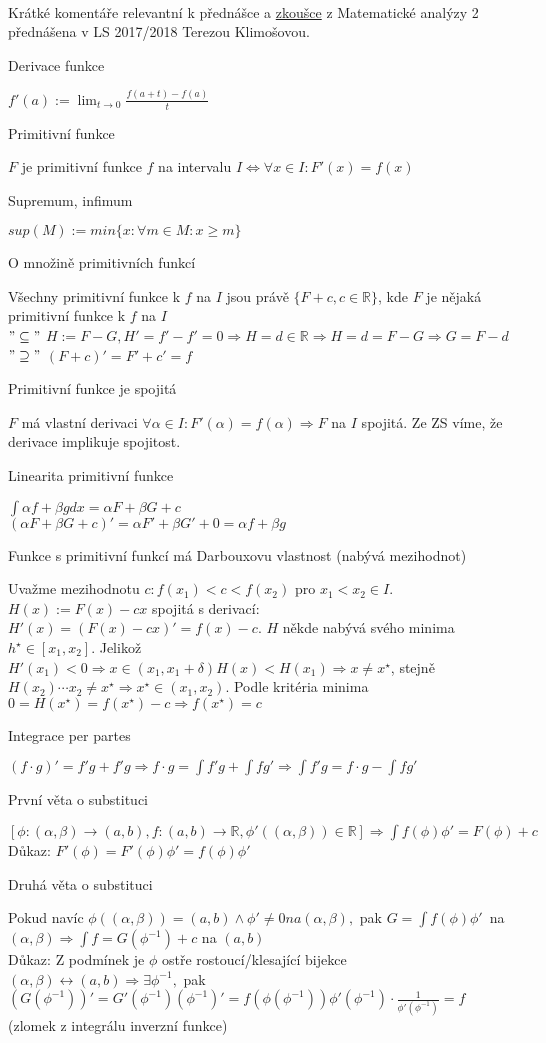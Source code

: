 \documentclass[a4paper]{article}
\theoremstyle{definition}
\newcommand{\baseAll}[3]{\begin{#1}{#2} \begin{flushleft} #3 \end{flushleft} \end{#1}}
\newcommand{\de}[2]{\baseAll{definition}{#1}{#2}}
\newcommand{\ve}[2]{\baseAll{theorem}{#1}{#2}}
\begin{document}
\text{}\vspace{-0.1cm}
{\fontsize{12}{15}\selectfont \hspace{-0.1cm}}
\vspace{1cm} \\
Krátké komentáře relevantní k přednášce a \href{https://iuuk.mff.cuni.cz/~tereza/teaching-files-17/popis-zkouskyMA2.pdf}{zkoušce} z Matematické analýzy 2 přednášena v LS 2017/2018 Terezou Klimošovou. 

\de{Derivace funkce}{$ f'(a) := \lim_{t \rightarrow 0} \frac{f(a+t)-f(a)}{t} $}
\de{Primitivní funkce}{ $ F $ je primitivní funkce $ f $ na intervalu $I  \Leftrightarrow \forall x \in I: F'(x) = f(x)$}
\de{Supremum, infimum}{ $ sup(M) := min\{x: \forall m \in M: x \ge m\}$}
\ve{O množině primitivních funkcí}{Všechny primitivní funkce k $f$ na $I$ jsou právě $\{F+c, c \in \mathbb{R}\}$, kde $F$ je nějaká primitivní funkce k $f$ na $I$ \\ $"\subseteq"$ $H := F-G, H' = f'-f' = 0 \Rightarrow H = d \in \mathbb{R} \Rightarrow H = d = F - G \Rightarrow G = F - d$ \\ $"\supseteq"$ $(F+c)' = F' + c' = f$}
\ve{Primitivní funkce je spojitá}{$F$ má vlastní derivaci $\forall \alpha \in I: F'(\alpha)=f(\alpha) \Rightarrow F$  na $I$ spojitá. Ze ZS víme, že derivace implikuje spojitost.}
\ve{Linearita primitivní funkce}{$\int \alpha f+ \beta g dx = \alpha F + \beta G +c $ \\ $( \alpha F + \beta G +c)' = \alpha F'+\beta G' +0 = \alpha f+\beta g  $}
\ve{Funkce s primitivní funkcí má Darbouxovu vlastnost (nabývá mezihodnot)}{Uvažme mezihodnotu $c: f(x_1) < c < f(x_2) $ pro $x_1 < x_2 \in I$. $H(x) := F(x) - cx $ spojitá s derivací: $H'(x) = (F(x) - cx)' = f(x)-c$. $H$ někde nabývá svého minima $h^\star \in [x_1,x_2]$. Jelikož $H'(x_1) <0 \Rightarrow x \in (x_1, x_1 + \delta) H(x) < H(x_1) \Rightarrow x \ne x^\star$, stejně $H(x_2) \cdots x_2 \ne x^\star \Rightarrow x^\star \in (x_1,x_2)$. Podle kritéria minima $0 = H(x^\star) = f(x^\star) - c \Rightarrow f(x^\star) = c$}
\ve{Integrace per partes}{$(f\cdot g)' = f'g + f'g \Rightarrow f \cdot g = \int f'g + \int fg' \Rightarrow \int f'g = f\cdot g - \int fg'$}
\ve{První věta o substituci}{$[\phi: (\alpha, \beta) \rightarrow (a,b), f: (a,b) \rightarrow \mathbb{R}, \phi'( (\alpha, \beta) ) \in \mathbb{R}] \Rightarrow \int f(\phi)\phi' = F(\phi) +c$\\Důkaz:  $F'(\phi) = F'(\phi)\phi' = f(\phi)\phi'$}
\ve{Druhá věta o substituci}{Pokud navíc $\phi((\alpha, \beta)) = (a,b) \wedge \phi' \ne 0 na (\alpha, \beta), $ pak $G = \int f(\phi)\phi' $\ na\ $(\alpha, \beta) \Rightarrow \int f = G(\phi^{-1}) + c$ na $(a,b)$\\Důkaz: Z podmínek je $\phi$ ostře rostoucí/klesající bijekce $(\alpha,\beta) \leftrightarrow (a,b) \Rightarrow \exists \phi^{-1}, $ pak $(G(\phi^{-1}))' = G'(\phi^{-1}) (\phi^{-1})' = f(\phi(\phi^{-1}))\phi'(\phi^{-1}) \cdot \frac{1}{\phi'(\phi^{-1})} =f $ (zlomek z integrálu inverzní funkce)}
\end{document}

